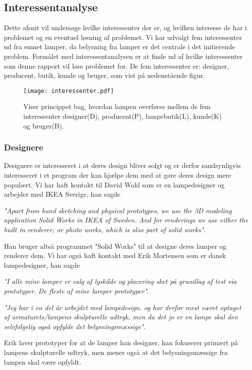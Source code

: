 \subsection{Interessentanalyse}
Dette afsnit vil undersøge hvilke interessenter der er, og hvilken interesse de har i problemet og en eventuel løsning af problemet. Vi har udvalgt fem interessenter ud fra emnet lamper, da belysning fra lamper er det centrale i det initierende problem. Formålet med interessentanalysen er at finde ud af hvilke interessenter som denne rapport vil løse problemet for. De fem interessenter er: designer, producent, butik, kunde og bruger, som vist på nedenstående figur.

\begin{figure}[H]
	\center\texttt{[image: interessenter.pdf]}
	\center\caption{Viser princippet bag, hvordan lampen overføres mellem de fem interessenter designer(D), producent(P), lampebutik(L), kunde(K) og bruger(B).}
    \label{fig:interessenter}
\end{figure}

\subsubsection{Designere}
Designere er interesseret i at deres design bliver solgt og er derfor sandsynligvis interesseret i et program der kan hjælpe dem med at gøre deres design mere populært.
Vi har haft kontakt til David Wahl som er en lampedesigner og arbejder med IKEA Sverige, han sagde 
\begin{center}
\textit{"Apart from hand sketching and physical prototypes, we use the 3D modeling application Solid Works in IKEA of Sweden. And for renderings we use either the built in renderer, or photo works, which is also part of solid works"}\cite{sec:mailDavid}.
\end{center}
Han bruger altså programmet "Solid Works"\cite{SolidWorks} til at designe deres lamper og renderer dem.
Vi har også haft kontakt med Erik Mortensen som er dansk lampedesigner, han sagde 
\begin{center}
\textit{"I alle mine lamper er valg af lyskilde og placering sket på grundlag af test via prototyper. De fleste af mine lamper prototyper"}.

\textit{"Jeg har i en del år arbejdet med lampedesign. og har derfor mest været optaget af armaturets/lampens skulpturelle udtryk, men da det jo er en lampe skal den selvfølgelig  også opfylde det belysningsmæssige"}\cite{sec:mailErik}.
\end{center}
 Erik laver prototyper for at de lamper han designer, han fokuserer primært på lampens skulpturelle udtryk, men mener også at det belysningsmæssige fra lampen skal være opfyldt. 


